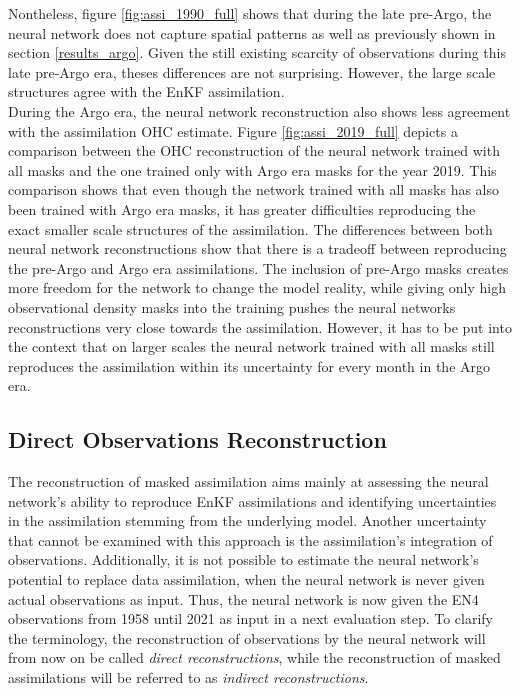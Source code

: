 \documentclass[Masterarbeit.tex]{subfile}
\begin{document}
	
	Nontheless, figure \ref{fig:assi_1990_full} shows that during the late pre-Argo, the neural network does not capture spatial patterns as well as previously shown in section \ref{results_argo}.	Given the still existing scarcity of observations during this late pre-Argo era, theses differences are not surprising. However, the large scale structures agree with the EnKF assimilation.\\
	
	
	During the Argo era, the neural network reconstruction also shows less agreement with the assimilation OHC estimate. Figure \ref{fig:assi_2019_full} depicts a comparison between the OHC reconstruction of the neural network trained with all masks and the one trained only with Argo era masks for the year 2019. This comparison shows that even though the network trained with all masks has also been trained with Argo era masks, it has greater difficulties reproducing the exact smaller scale structures of the assimilation. The differences between both neural network reconstructions show that there is a tradeoff between reproducing the pre-Argo and Argo era assimilations. The inclusion of pre-Argo masks creates more freedom for the network to change the model reality, while giving only high observational density masks into the training pushes the neural networks reconstructions very close towards the assimilation. However, it has to be put into the context that on larger scales the neural network trained with all masks still reproduces the assimilation within its uncertainty for every month in the Argo era. \\
	
	\subsection{Direct Observations Reconstruction} \label{analysis_direct}
	
	The reconstruction of masked assimilation aims mainly at assessing the neural network's ability to reproduce EnKF assimilations and identifying uncertainties in the assimilation stemming from the underlying model. Another uncertainty that cannot be examined with this approach is the assimilation's integration of observations. Additionally, it is not possible to estimate the neural network's potential to replace data assimilation, when the neural network is never given actual observations as input. Thus, the neural network is now given the EN4 observations from 1958 until 2021 as input in a next evaluation step. To clarify the terminology, the reconstruction of observations by the neural network will from now on be called \textit{direct reconstructions}, while the reconstruction of masked assimilations will be referred to as \textit{indirect reconstructions}.\\
	
\end{document}
